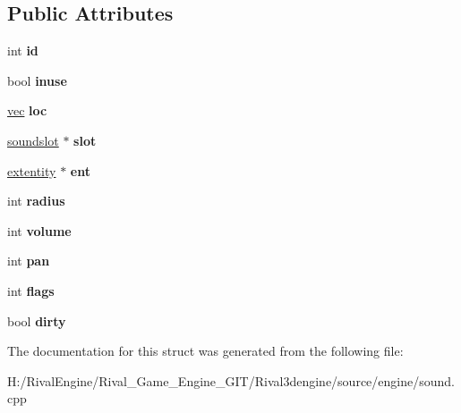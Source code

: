 \subsection*{Public Attributes}
\begin{DoxyCompactItemize}
\item 
\mbox{\label{structsoundchannel_a6461c5c1111856a468f1f2d9058840be}} 
int {\bfseries id}
\item 
\mbox{\label{structsoundchannel_a3c2698705fb46e4b798b2f56d4c5b325}} 
bool {\bfseries inuse}
\item 
\mbox{\label{structsoundchannel_a5b0a7d0711b3dc4076147321f54971f3}} 
\hyperlink{structvec}{vec} {\bfseries loc}
\item 
\mbox{\label{structsoundchannel_a02fd5b3308b7bf896d73b3909f1697b3}} 
\hyperlink{structsoundslot}{soundslot} $\ast$ {\bfseries slot}
\item 
\mbox{\label{structsoundchannel_a58d08d9f8b83e25abdbcea3da61aba80}} 
\hyperlink{structextentity}{extentity} $\ast$ {\bfseries ent}
\item 
\mbox{\label{structsoundchannel_a8c8631935f53132e719cf4c2d6179c59}} 
int {\bfseries radius}
\item 
\mbox{\label{structsoundchannel_ac2fef027b2b3af671c505fc27b589dc2}} 
int {\bfseries volume}
\item 
\mbox{\label{structsoundchannel_a4cdde97b5e3637beb88b3f443cbf1b92}} 
int {\bfseries pan}
\item 
\mbox{\label{structsoundchannel_aedeae9a6613b8ba707b8e8d5fd51162c}} 
int {\bfseries flags}
\item 
\mbox{\label{structsoundchannel_aa53f9826a7dfc04a2060a0c94536cbab}} 
bool {\bfseries dirty}
\end{DoxyCompactItemize}


The documentation for this struct was generated from the following file\+:\begin{DoxyCompactItemize}
\item 
H\+:/\+Rival\+Engine/\+Rival\+\_\+\+Game\+\_\+\+Engine\+\_\+\+G\+I\+T/\+Rival3dengine/source/engine/sound.\+cpp\end{DoxyCompactItemize}
